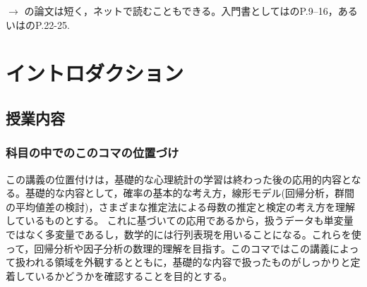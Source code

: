 \begin{flushright}
    $\to$ \citet{stevens1946}の論文は短く，ネットで読むこともできる。入門書としては\citet{川端201408}のP.9--16，あるいは\citet{Yamada2004}のP.22-25.
\end{flushright}
\section{イントロダクション}
\subsection{授業内容}
\subsubsection{科目の中でのこのコマの位置づけ}
この講義の位置付けは，基礎的な心理統計の学習は終わった後の応用的内容となる。基礎的な内容として，確率の基本的な考え方，線形モデル(回帰分析，群間の平均値差の検討)，さまざまな推定法による母数の推定と検定の考え方を理解しているものとする。
これに基づいての応用であるから，扱うデータも単変量ではなく多変量であるし，数学的には行列表現を用いることになる。これらを使って，回帰分析や因子分析の数理的理解を目指す。このコマではこの講義によって扱われる領域を外観するとともに，基礎的な内容で扱ったものがしっかりと定着しているかどうかを確認することを目的とする。

